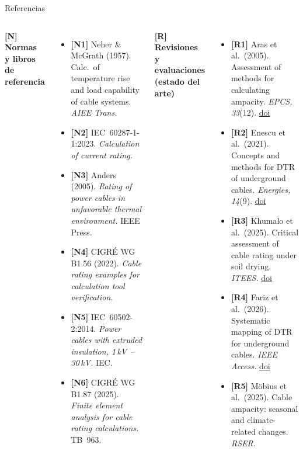 \documentclass[aspectratio=169]{beamer}
\begin{document}
\begin{frame}{Referencias}
\begin{columns}[T]

{\footnotesize\color{blue!60!black}\textbf{[N] Normas y libros de referencia}}
\vspace{0.1pt}
\begin{itemize}[leftmargin=*,itemsep=1pt]\scriptsize
  \item \textbf{[N1]} Neher \& McGrath (1957). Calc.\ of temperature rise and
        load capability of cable systems. \textit{AIEE Trans.}
  \item \textbf{[N2]} IEC~60287-1-1:2023. \textit{Calculation of current rating.}
  \item \textbf{[N3]} Anders (2005). \textit{Rating of power cables in unfavorable
        thermal environment.} IEEE Press.
  \item \textbf{[N4]} CIGRÉ WG B1.56 (2022). \textit{Cable rating examples for
        calculation tool verification.}
  \item \textbf{[N5]} IEC~60502-2:2014. \textit{Power cables with extruded
        insulation, 1\,kV -- 30\,kV.} IEC.
  \item \textbf{[N6]} CIGRÉ WG B1.87 (2025). \textit{Finite element analysis
        for cable rating calculations.} TB~963.
\end{itemize}

\vspace{0.1pt}
{\footnotesize\color{teal!70!black}\textbf{[R] Revisiones y evaluaciones (estado del arte)}}
\vspace{0.1pt}
\begin{itemize}[leftmargin=*,itemsep=1pt]\scriptsize
  \item \textbf{[R1]} Aras et al.\ (2005). Assessment of methods for calculating
        ampacity. \textit{EPCS, 33}(12). \href{https://doi.org/10.1080/15325000590964425}{doi}
  \item \textbf{[R2]} Enescu et al.\ (2021). Concepts and methods for DTR of
        underground cables. \textit{Energies, 14}(9). \href{https://doi.org/10.3390/en14092591}{doi}
  \item \textbf{[R3]} Khumalo et al.\ (2025). Critical assessment of cable
        rating under soil drying. \textit{ITEES.} \href{https://doi.org/10.1155/etep/5946564}{doi}
  \item \textbf{[R4]} Fariz et al.\ (2026). Systematic mapping of DTR for
        underground cables. \textit{IEEE Access.} \href{https://doi.org/10.1109/ACCESS.2025.3650354}{doi}
  \item \textbf{[R5]} Möbius et al.\ (2025). Cable ampacity: seasonal and
        climate-related changes. \textit{RSER.}
\end{itemize}


\end{columns}
\end{frame}
\end{document}
